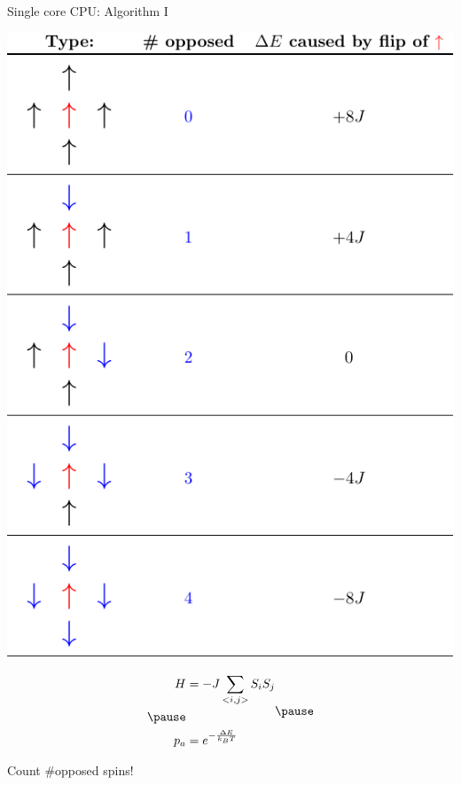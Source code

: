 \documentclass{beamer}
\begin{document}
\begin{frame}{Single core CPU: Algorithm I}
    \begin{minipage}{0.5\textwidth}
        \includegraphics[keepaspectratio=true, scale=0.6]{images/cases.pdf}\\
    \end{minipage} \pause
    \hfill
    \begin{minipage}{0.4\textwidth}
        \begin{equation*}
        \begin{aligned}
            H &= - J \sum_{<i, j>} S_i S_j \\ \pause
            \\
            p_a &= e^{-\frac{\Delta E}{k_B T}}
        \end{aligned} \pause
        \end{equation*}
        \begin{highlightbox}
            Count \#opposed spins!
        \end{highlightbox}
    \end{minipage}
\end{frame}
\end{document}
